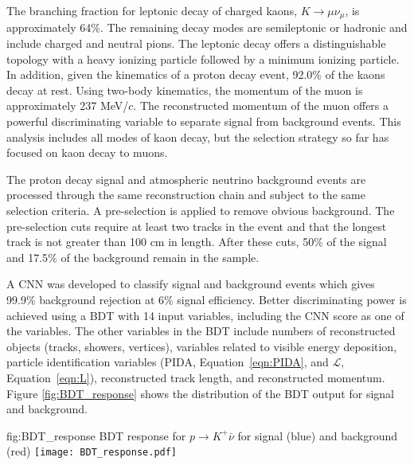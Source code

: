 The branching fraction for leptonic decay of charged kaons, $K\rightarrow \mu \nu_{\mu}$, is approximately 64$\%$. The remaining decay modes are semileptonic or hadronic and include charged and neutral pions. The leptonic decay offers a distinguishable topology with a heavy ionizing particle followed by a minimum ionizing particle. In addition, given the kinematics of a proton decay event, 92.0$\%$ of the kaons decay at rest. Using two-body kinematics, the momentum of the muon is approximately 237 MeV/$c$. The reconstructed momentum of the muon offers a powerful discriminating variable to separate signal from background events.  This analysis includes all modes of kaon decay, but the selection strategy so far has focused on kaon decay to muons.

The proton decay signal and atmospheric neutrino background events are processed through the same reconstruction chain and subject to the same selection criteria. A pre-selection is applied to remove obvious background. The pre-selection cuts require at least two tracks in the event and that the longest track is not greater than 100 cm in length. After these cuts, 50$\%$ of the signal and 17.5$\%$ of the background remain in the sample.

A CNN was developed to classify signal and background events which gives 99.9\% background rejection at 6\% signal efficiency.  Better discriminating power is achieved using a BDT with 14 input variables, including the CNN score as one of the variables.  The other variables in the BDT include numbers of reconstructed objects (tracks, showers, vertices), variables related to visible energy deposition, particle identification variables (PIDA, Equation~\ref{eqn:PIDA}, and $\mathcal{L}$, Equation~\ref{eqn:L}), reconstructed track length, and reconstructed momentum.
Figure \ref{fig:BDT_response} shows the distribution of the BDT output for signal and background.

\begin{dunefigure}
{fig:BDT_response}
{BDT response for $p\rightarrow K^{+} \bar{\nu}$ for signal (blue) and background (red)}
\texttt{[image: BDT\_response.pdf]}
\end{dunefigure} 


